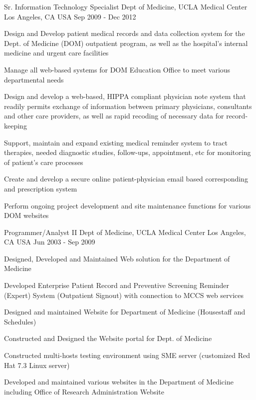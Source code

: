 \begin{cventries}
  \cventry
    {Sr. Information Technology Specialist} %
    {Dept of Medicine, UCLA Medical Center} %
    {Los Angeles, CA USA} %
    {Sep 2009 - Dec 2012} %
    {
      \begin{cvitems} %
        \item {Design and Develop patient medical records and data collection system for the Dept. of Medicine (DOM) outpatient program, as well as the hospital's internal medicine and urgent care facilities}
        \item {Manage all web-based systems for DOM Education Office to meet various departmental needs}      
		 \item {Design and develop a web-based, HIPPA compliant physician note system that readily permits exchange of information between primary physicians, consultants and other care providers, as well as rapid recoding of necessary data for record-keeping} 
		 \item{Support, maintain and expand existing medical reminder system to tract therapies, needed diagnostic studies, follow-ups, appointment, etc for monitoring of patient's care processes}  
		 \item{Create and develop a secure online patient-physician email based corresponding and prescription system}
		 \item{Perform ongoing project development and site maintenance functions for various DOM websites}
      \end{cvitems}
    }

 \cventry
    {Programmer/Analyst II} %
    {Dept of Medicine, UCLA Medical Center} %
    {Los Angeles, CA USA} %
    {Jun 2003 - Sep 2009} %
    {
      \begin{cvitems} %
        \item {Designed, Developed and Maintained Web solution for the Department of Medicine}
		 \item {Developed Enterprise Patient Record and Preventive Screening Reminder (Expert) System (Outpatient Signout) with connection to MCCS web services}
		  \item {Designed and maintained Website for Department of Medicine (Housestaff and Schedules)}
		  \item {Constructed and Designed the Website portal for Dept. of Medicine}
		   \item {Constructed multi-hosts testing environment using SME server (customized Red Hat 7.3 Linux server)}
		   \item {Developed and maintained various websites in the Department of Medicine including Office of Research Administration Website}
      \end{cvitems}
    }


\end{cventries}
